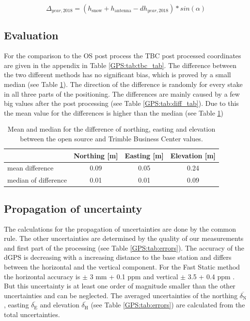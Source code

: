 \begin{equation}
	\Delta_{year,2018} = (h_{\text{snow}} + h_{\text{antenna}} - dh_{year,2018}) * sin(\alpha)
\end{equation}

\subsection{Evaluation}
For the comparison to the OS post process the TBC post processed coordinates are given in the appendix in Table \ref{GPS:tab:tbc_tab}.
The difference between the two different methods has no significant bias, which is proved by a small median (see Table \ref{GPS:tab:diff}).
The direction of the difference is randomly for every stake in all three parts of the positioning.
The differences are mainly caused by a few big values after the post processing (see Table \ref{GPS:tab:diff_tab}).
Due to this the mean value for the differences is higher than the median (see Table \ref{GPS:tab:diff}) 

\begin{table}[H]
	\caption{Mean and median for the difference of northing, easting and elevation between the open source and Trimble Business Center values.}
	\centering
	\begin{tabular}{lccc}
	\toprule         
      &  Northing [m] & Easting [m] & Elevation [m] \\
	\midrule
    mean difference &  0.09 & 0.05 & 0.24 \\
    median of difference & 0.01 & 0.01 & 0.09 \\
    \bottomrule
	\end{tabular}
	\label{GPS:tab:diff}
\end{table}

\subsection{Propagation of uncertainty}

The calculations for the propagation of uncertainties are done by the common rule.
The other uncertainties are determined by the quality of our measurements and first part of the processing (see Table \ref{GPS:tab:errors}).
The accuracy of the dGPS is decreasing with a increasing distance to the base station and differs between the horizontal and the vertical component.
For the Fast Static method the horizontal accuracy is $ \pm $ 3 mm + 0.1 ppm and vertical $ \pm $ 3.5 + 0.4 ppm  \citep{Trquickstart}.
But this uncertainty is at least one order of magnitude smaller than the other uncertainties and can be neglected. 
The averaged uncertainties of the northing $ \overline{\delta_{\text{N}}} $, easting $ \overline{\delta_{\text{E}}} $ and elevation $ \overline{\delta_{\text{H}}} $ (see Table \ref{GPS:tab:errors}) are calculated from the total uncertainties.

